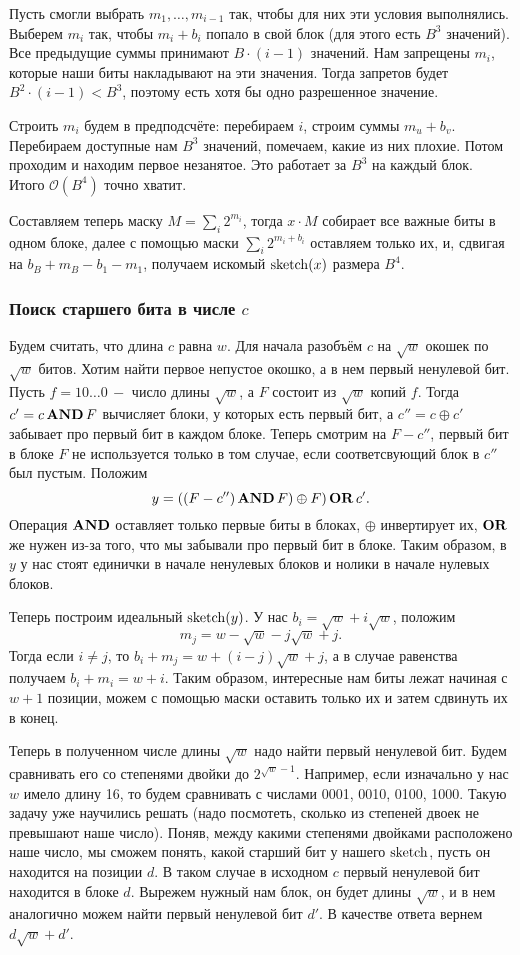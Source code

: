 Пусть смогли выбрать $m_1, \ldots, m_{i-1}$ так, чтобы для них эти условия выполнялись. Выберем $m_i$ так, чтобы $m_i + b_i$ попало в свой блок (для этого есть $B^3$ значений). Все предыдущие суммы принимают $B\cdot(i-1)$ значений. Нам запрещены $m_i$, которые наши биты накладывают на эти значения. Тогда запретов будет $B^2\cdot(i-1) < B^3$, поэтому есть хотя бы одно разрешенное значение.

Строить $m_i$ будем в предподсчёте: перебираем $i$, строим суммы $m_u + b_v$. Перебираем доступные нам $B^3$ значений, помечаем, какие из них плохие. Потом проходим и находим первое незанятое. Это работает за $B^3$ на каждый блок. Итого $\mathcal{O}(B^4)$ точно хватит.

Составляем теперь маску $M = \sum_i 2^{m_i}$, тогда $x\cdot M$ собирает все важные биты в одном блоке, далее с помощью маски $\sum_i 2^{m_i + b_i}$ оставляем только их, и, сдвигая на $b_B+m_B-b_1-m_1$, получаем искомый $\operatorname{sketch}(x)$ размера $B^4$.

\subsubsection{Поиск старшего бита в числе $c$}
Будем считать, что длина $c$ равна $w$.
Для начала разобъём $c$ на $\sqrt{w}$ окошек по $\sqrt{w}$ битов. Хотим найти первое непустое окошко, а в нем первый ненулевой бит. Пусть $f = 10\ldots0 \, -$ число длины $\sqrt{w}$, а $F$ состоит из $\sqrt{w}$ копий $f$. Тогда $c' = c \operatorname{\mathbf{AND}} F$ вычисляет блоки, у которых есть первый бит, а $c'' = c \oplus c'$ забывает про первый бит в каждом блоке. Теперь смотрим на $F - c''$, первый бит в блоке $F$ не используется только в том случае, если соответсвующий блок в $c''$ был пустым. Положим \[ y = ((F - c'') \operatorname{\mathbf{AND}} F) \oplus F) \operatorname{\mathbf{OR}} c'. \] Операция $\operatorname{\mathbf{AND}}$ оставляет только первые биты в блоках, $\oplus$ инвертирует их, $\operatorname{\mathbf{OR}}$ же нужен из-за того, что мы забывали про первый бит в блоке. Таким образом, в $y$ у нас стоят единички в начале ненулевых блоков и нолики в начале нулевых блоков.

Теперь построим идеальный $\operatorname{sketch}(y)$. У нас $b_i = \sqrt{w} + i\sqrt{w}$, положим \[ m_j = w - \sqrt{w} - j\sqrt{w} + j. \] Тогда если $i \neq j$, то $b_i + m_j = w + (i-j)\sqrt{w} + j$, а в случае равенства получаем $b_i + m_i = w + i$. Таким образом, интересные нам биты лежат начиная с $w+1$ позиции, можем с помощью маски оставить только их и затем сдвинуть их в конец.

Теперь в полученном числе длины $\sqrt{w}$ надо найти первый ненулевой бит. Будем сравнивать его со степенями двойки до $2^{\sqrt{w}-1}$. Например, если изначально у нас $w$ имело длину 16, то будем сравнивать с числами 0001, 0010, 0100, 1000. Такую задачу уже научились решать (надо посмотеть, сколько из степеней двоек не превышают наше число). Поняв, между какими степенями двойками расположено наше число, мы сможем понять, какой старший бит у нашего $\operatorname{sketch}$, пусть он находится на позиции $d$. В таком случае в исходном $c$ первый ненулевой бит находится в блоке $d$. Вырежем нужный нам блок, он будет длины $\sqrt{w}$, и в нем аналогично можем найти первый ненулевой бит $d'$. В качестве ответа вернем $d\sqrt{w} + d'$.

